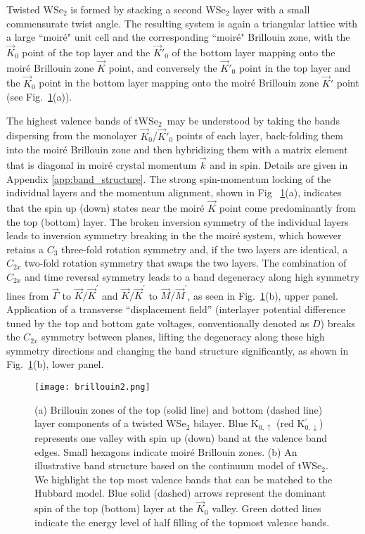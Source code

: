\documentclass[%
reprint,
superscriptaddress,
twocolumn,
 amsmath,amssymb,
 aps,
 prb,
]{revtex4-2}
\newcommand{\twsetwo}{tWSe$_2$}
\begin{document}
Twisted WSe$_2$ is formed by stacking a second WSe$_2$ layer with a small commensurate twist angle. The resulting system is again a triangular lattice with a large ``moir\'e" unit cell and the corresponding ``moir\'e" Brillouin zone, with the $\vec K_0$ point of the top layer and the $\vec K'_0$ of the bottom layer mapping onto the moir\'e Brillouin zone $\vec K$ point, and conversely the $\vec K'_0$ point in the top layer and the $\vec K_0$ point in the bottom layer mapping onto the moir\'e Brillouin zone $\vec K'$ point (see Fig.~\ref{brillouin}(a)). 


The highest valence bands of \twsetwo~may be understood \cite{wu2018hubbard,Wang:2020us} by taking the bands dispersing from the monolayer $\vec K_0$/$\vec K'_0$ points of each layer, back-folding them into the moir\'e Brillouin zone and then hybridizing them with a matrix element that is diagonal in moir\'e crystal momentum $\vec k$ and in spin. Details are given in Appendix \ref{app:band_structure}. The  strong spin-momentum locking of the individual layers and the momentum alignment, shown in Fig ~\ref{brillouin}(a), indicates that the spin up (down)  states near the moir\'e $\vec K$ point come predominantly from the top (bottom) layer. The broken inversion symmetry of the individual layers leads to inversion symmetry breaking in the the moir\'e system, which however retains a $C_3$ three-fold rotation symmetry and, if the two layers are identical, a $C_{2x}$ two-fold rotation symmetry that swaps the two layers. The combination of $C_{2x}$ and time reversal symmetry leads to a band degeneracy along high symmetry lines from $ \vec{\Gamma}$ to  $\vec K/\vec K^\prime$ and $\vec K/\vec K^\prime$ to  $\vec M/\vec M^\prime$, as seen in Fig.~\ref{brillouin}(b), upper panel. Application of a transverse ``displacement field'' (interlayer potential difference tuned by the top and bottom gate voltages, conventionally denoted as $D$) breaks the $C_{2x}$ symmetry between planes, lifting the degeneracy along these high symmetry directions and changing the band structure significantly,  as shown in Fig.~\ref{brillouin}(b), lower panel.

\begin{figure}[ht]
	\centering
	\texttt{[image: brillouin2.png]}
	\caption{(a) Brillouin zones of the top (solid line) and bottom (dashed line) layer components of a twisted WSe$_2$ bilayer. Blue K$_{0,\uparrow}$ (red K$^\prime _{0,\downarrow}$) represents one valley with spin up (down) band at the valence band edges. Small hexagons indicate moir\'e Brillouin zones. (b) An illustrative band structure based on the continuum model of \twsetwo. We highlight the top most valence bands that can be matched to the Hubbard model. Blue solid (dashed) arrows represent the dominant spin of the top (bottom) layer at the $\vec{K}_0$ valley.
	Green dotted lines indicate the energy level of half filling of the topmost valence bands.}
	\label{brillouin}	
\end{figure}
\end{document}
